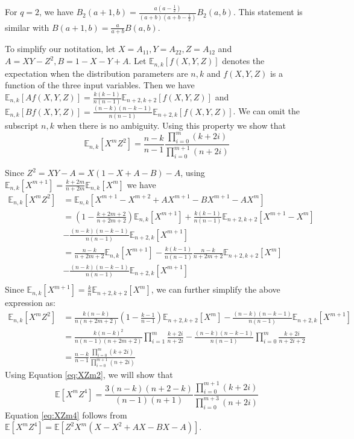 \documentclass{article}
\def\E{\mathbb{E}}
\begin{document}
For $q=2$,
we have $B_2(a+1,b)=\frac{a(a-\frac{1}{2})}{(a+b)(a+b-\frac{1}{2})} B_2(a,b)$.
This statement is similar with
$B(a+1,b) = \frac{a}{a+b}B(a,b)$.

To simplify our notitation,
let $X = A_{11}, Y = A_{22}, Z = A_{12}$ and
$A = XY - Z^2, B = 1 - X - Y + A$.
Let $\E_{n,k}[f(X,Y,Z)]$ denotes the expectation
when the distribution parameters are $n, k$
and $f(X,Y,Z)$ is a function of the three input variables.
Then we have $\E_{n,k}[Af(X,Y,Z)] =
\frac{k(k-1)}{n(n-1)}\E_{n+2,k+2}[f(X,Y,Z)]$
and $\E_{n,k}[Bf(X,Y,Z)] = \frac{(n-k)(n-k-1)}{n(n-1)}\E_{n+2, k}[f(X,Y,Z)]$.
We can omit the subscript $n,k$ when there is no ambiguity.
Using this property we show that
\begin{equation}\label{eq:XZm2}
\E_{n,k}[X^m Z^2] = \frac{n-k}{n-1}
\frac{\prod_{i=0}^m (k+2i)}{\prod_{i=0}^{m+1} (n+2i)}
\end{equation}

Since $Z^2 = XY - A = X(1-X+A-B)-A$,
using $\E_{n,k}[X^{m+1}] = \frac{k+2m}{n+2m}\E_{n,k}[X^m]$ we have
\begin{align*}
\E_{n,k}[X^m Z^2] & = \E_{n,k}[X^{m+1}-X^{m+2}+AX^{m+1}-BX^{m+1}-AX^m] \\
& = (1-\frac{k+2m+2}{n+2m+2})\E_{n,k}[X^{m+1}] +
\frac{k(k-1)}{n(n-1)}\E_{n+2,k+2}[X^{m+1} - X^m]\\
& - \frac{(n-k)(n-k-1)}{n(n-1)} \E_{n+2,k}[X^{m+1}] \\
& = \frac{n-k}{n+2m+2}\E_{n,k}[X^{m+1}] -
\frac{k(k-1)}{n(n-1)}\frac{n-k}{n+2m+2}\E_{n+2,k+2}[X^m] \\
& - \frac{(n-k)(n-k-1)}{n(n-1)} \E_{n+2,k}[X^{m+1}] \\
\end{align*}
Since $\E_{n,k}[X^{m+1}] = \frac{k}{n}\E_{n+2,k+2}[X^m]$,
we can further simplify the above expression as:
\begin{align*}
\E_{n,k}[X^m Z^2] &=
\frac{k(n-k)}{n(n+2m+2)}(1-\frac{k-1}{n-1})\E_{n+2,k+2}[X^m] -
\frac{(n-k)(n-k-1)}{n(n-1)} \E_{n+2,k}[X^{m+1}]\\
& = \frac{k(n-k)^2}{n(n-1)(n+2m+2)}\prod_{i=1}^m \frac{k+2i}{n+2i} -
\frac{(n-k)(n-k-1)}{n(n-1)}\prod_{i=0}^m \frac{k+2i}{n+2i+2} \\
& = \frac{n-k}{n-1}\frac{\prod_{i=0}^m (k+2i)}{\prod_{i=0}^{m+1} (n+2i)}
\end{align*}
Using Equation \eqref{eq:XZm2}, we will show that
\begin{equation}\label{eq:XZm4}
\E[X^m Z^4] = \frac{3(n-k)(n+2-k)}{(n-1)(n+1)}
\frac{\prod_{i=0}^{m+1} (k+2i)}{\prod_{i=0}^{m+3} (n+2i)}
\end{equation}
Equation \eqref{eq:XZm4} follows from
$\E[X^m Z^4 ] = \E[Z^2 X^m(X-X^2 +AX-BX-A)]$.
\end{document}
